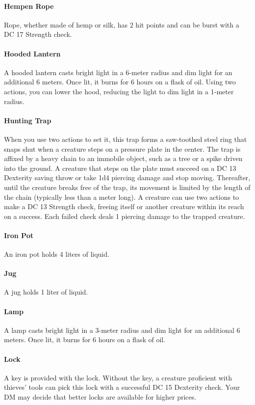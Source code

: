     \paragraph{Hempen Rope}
        Rope, whether made of hemp or silk, has 2 hit points and can be burst with a DC 17 Strength check.
    \paragraph{Hooded Lantern}
        A hooded lantern casts bright light in a 6-meter radius and dim light for an additional 6 meters.
        Once lit, it burns for 6 hours on a flask of oil.
        Using two actions, you can lower the hood, reducing the light to dim light in a 1-meter radius.
    \paragraph{Hunting Trap}
        When you use two actions to set it, this trap forms a saw-toothed steel ring that snaps shut when a creature steps on a pressure plate in the center.
        The trap is affixed by a heavy chain to an immobile object, such as a tree or a spike driven into the ground.
        A creature that steps on the plate must succeed on a DC 13 Dexterity saving throw or take 1d4 piercing damage and stop moving.
        Thereafter, until the creature breaks free of the trap, its movement is limited by the length of the chain (typically less than a meter long).
        A creature can use two actions to make a DC 13 Strength check, freeing itself or another creature within its reach on a success.
        Each failed check deals 1 piercing damage to the trapped creature.
    \paragraph{Iron Pot}
        An iron pot holds 4 liters of liquid.
    \paragraph{Jug}
        A jug holds 1 liter of liquid.
    \paragraph{Lamp}
        A lamp casts bright light in a 3-meter radius and dim light for an additional 6 meters.
        Once lit, it burns for 6 hours on a flask of oil.
    \paragraph{Lock}
        A key is provided with the lock.
        Without the key, a creature proficient with thieves' tools can pick this lock with a successful DC 15 Dexterity check.
        Your DM may decide that better locks are available for higher prices.

